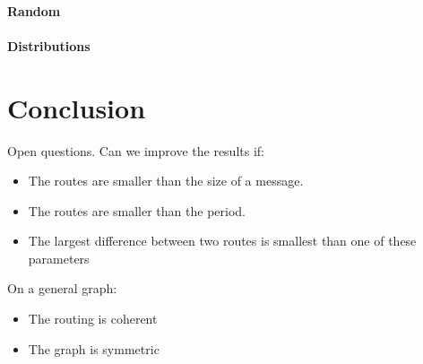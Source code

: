 \documentclass[a4paper,10pt]{article}
\begin{document}
	 \paragraph{Random}
	 \paragraph{Distributions}
   
\section{Conclusion}


Open questions. Can we improve the results if:
\begin{itemize}
 \item The routes are smaller than the size of a message. 
\item The routes are smaller than the period.
\item The largest difference between two routes is smallest than one of these parameters
\end{itemize}

 On a general graph:
 
\begin{itemize}
\item The routing is coherent
 \item The graph is symmetric
\end{itemize}




\end{document}
